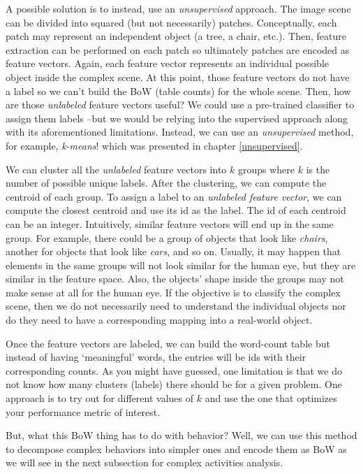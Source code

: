 \documentclass[
  11pt,
]{krantz}
\begin{document}
A possible solution is to instead, use an \emph{unsupervised} approach. The image scene can be divided into squared (but not necessarily) patches. Conceptually, each patch may represent an independent object (a tree, a chair, etc.). Then, feature extraction can be performed on each patch so ultimately patches are encoded as feature vectors. Again, each feature vector represents an individual possible object inside the complex scene. At this point, those feature vectors do not have a label so we can't build the BoW (table counts) for the whole scene. Then, how are those \emph{unlabeled} feature vectors useful? We could use a pre-trained classifier to assign them labels --but we would be relying into the supervised approach along with its aforementioned limitations. Instead, we can use an \emph{unsupervised} method, for example, \emph{k-means}! which was presented in chapter \ref{unsupervised}.

We can cluster all the \emph{unlabeled} feature vectors into \(k\) groups where \(k\) is the number of possible unique labels. After the clustering, we can compute the centroid of each group. To assign a label to an \emph{unlabeled feature vector}, we can compute the closest centroid and use its id as the label. The id of each centroid can be an integer. Intuitively, similar feature vectors will end up in the same group. For example, there could be a group of objects that look like \emph{chairs}, another for objects that look like \emph{cars}, and so on. Usually, it may happen that elements in the same groups will not look similar for the human eye, but they are similar in the feature space. Also, the objects' shape inside the groups may not make sense at all for the human eye. If the objective is to classify the complex scene, then we do not necessarily need to understand the individual objects nor do they need to have a corresponding mapping into a real-world object.

Once the feature vectors are labeled, we can build the word-count table but instead of having `meaningful' words, the entries will be ids with their corresponding counts. As you might have guessed, one limitation is that we do not know how many clusters (labels) there should be for a given problem. One approach is to try out for different values of \(k\) and use the one that optimizes your performance metric of interest.

But, what this BoW thing has to do with behavior? Well, we can use this method to decompose complex behaviors into simpler ones and encode them as BoW as we will see in the next subsection for complex activities analysis.
\end{document}

